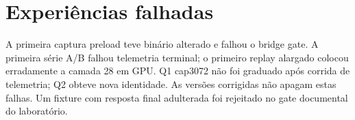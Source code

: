 \section{Experiências falhadas}
A primeira captura preload teve binário alterado e falhou o bridge gate. A primeira série A/B falhou telemetria terminal; o primeiro replay alargado colocou erradamente a camada 28 em GPU. Q1 cap3072 não foi graduado após corrida de telemetria; Q2 obteve nova identidade. As versões corrigidas não apagam estas falhas. Um fixture com resposta final adulterada foi rejeitado no gate documental do laboratório.  

